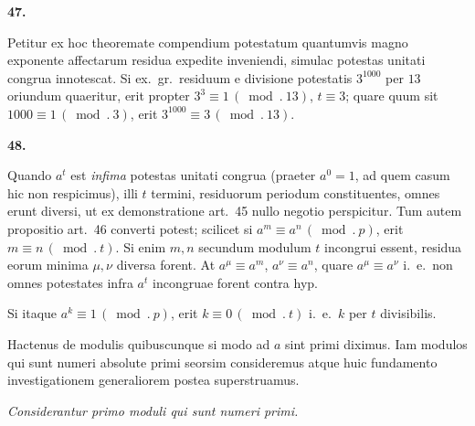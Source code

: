 \documentclass[12pt,a4paper]{article}
\begin{document}
\bigskip

\noindent\textbf{47.}

\medskip

Petitur ex hoc theoremate compendium potestatum quantumvis magno exponente
affectarum residua expedite inveniendi, simulac potestas unitati congrua innotescat.
Si ex.\ gr.\ residuum e divisione potestatis $3^{1000}$ per $13$ oriundum quaeritur,
erit propter $3^{3} \equiv 1\,(\bmod.\ 13)$, $t \equiv 3$; quare quum sit
$1000 \equiv 1\,(\bmod.\ 3)$, erit $3^{1000} \equiv 3\,(\bmod.\ 13)$.

\bigskip

\noindent\textbf{48.}

\medskip

Quando $a^{t}$ est \textit{infima} potestas unitati congrua (praeter $a^{0} = 1$, ad
quem casum hic non respicimus), illi $t$ termini, residuorum periodum constituentes,
omnes erunt diversi, ut ex demonstratione art.~45 nullo negotio perspicitur. Tum
autem propositio art.~46 converti potest; scilicet si $a^{m} \equiv a^{n}\,(\bmod.\
p)$, erit $m \equiv n\,(\bmod.\ t)$. Si enim $m, n$ secundum modulum $t$ incongrui
essent, residua eorum minima $\mu, \nu$ diversa forent. At $a^{\mu} \equiv a^{m}$,
$a^{\nu} \equiv a^{n}$, quare $a^{\mu} \equiv a^{\nu}$ i.~e.\ non omnes potestates
infra $a^{t}$ incongruae forent contra hyp.

Si itaque $a^{k} \equiv 1\,(\bmod.\ p)$, erit $k \equiv 0\,(\bmod.\ t)$ i.~e.\ $k$
per $t$ divisibilis.

\medskip

Hactenus de modulis quibuscunque si modo ad $a$ sint primi diximus. Iam modulos qui
sunt numeri absolute primi seorsim consideremus atque huic fundamento investigationem
generaliorem postea superstruamus.

\clearpage

\begin{center}
\textit{Considerantur primo moduli qui sunt numeri primi.}
\end{center}
\end{document}
